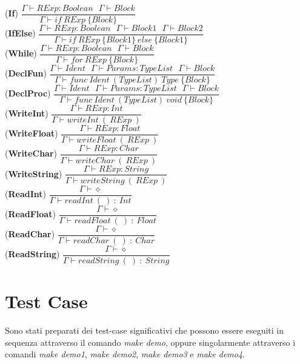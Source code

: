 \documentclass[12pt]{article}
\begin{document}
\begin{center}
\noindent(\textbf{If})
$\dfrac{\Gamma \vdash RExp:Boolean\ \ \ \Gamma \vdash Block}{\Gamma \vdash if\ RExp\ \{ Block\}}$\\[0.1in]
\noindent(\textbf{IfElse})
$\dfrac{\Gamma \vdash RExp:Boolean\ \ \ \Gamma \vdash Block1\ \ \ \Gamma \vdash Block2}{\Gamma \vdash if\ RExp\ \{ Block1\}\ else\ \{ Block1\}}$\\[0.1in]
\noindent(\textbf{While})
$\dfrac{\Gamma \vdash RExp:Boolean\ \ \ \Gamma \vdash Block}{\Gamma \vdash for\ RExp\ \{ Block\}}$\\[0.1in]

\noindent(\textbf{DeclFun})
$\dfrac{\Gamma \vdash Ident\ \ \ \Gamma \vdash Params:TypeList\ \ \ \Gamma \vdash Block}{\Gamma \vdash func\ Ident\ (TypeList)\ Type\ \{Block\}}$\\[0.1in]
\noindent(\textbf{DeclProc})
$\dfrac{\Gamma \vdash Ident\ \ \ \Gamma \vdash Params:TypeList\ \ \ \Gamma \vdash Block}{\Gamma \vdash func\ Ident\ (TypeList)\ void\ \{Block\}}$\\[0.1in]

\noindent(\textbf{WriteInt})
$\dfrac{\Gamma \vdash RExp:Int}{\Gamma \vdash writeInt\ (\ RExp\ )}$\\[0.1in]
\noindent(\textbf{WriteFloat})
$\dfrac{\Gamma \vdash RExp:Float}{\Gamma \vdash writeFloat\ (\ RExp\ )}$\\[0.1in]
\noindent(\textbf{WriteChar})
$\dfrac{\Gamma \vdash RExp:Char}{\Gamma \vdash writeChar\ (\ RExp\ )}$\\[0.1in]
\noindent(\textbf{WriteString})
$\dfrac{\Gamma \vdash RExp:String}{\Gamma \vdash writeString\ (\ RExp\ )}$\\[0.1in]
\noindent(\textbf{ReadInt})
$\dfrac{\Gamma \vdash \diamond}{\Gamma \vdash readInt\ (\ )\ :\ Int}$\\[0.1in]
\noindent(\textbf{ReadFloat})
$\dfrac{\Gamma \vdash \diamond}{\Gamma \vdash readFloat\ (\ )\ :\ Float}$\\[0.1in]
\noindent(\textbf{ReadChar})
$\dfrac{\Gamma \vdash \diamond}{\Gamma \vdash readChar\ (\ )\ :\ Char}$\\[0.1in]
\noindent(\textbf{ReadString})
$\dfrac{\Gamma \vdash \diamond}{\Gamma \vdash readString\ (\ )\ :\ String}$\\[0.1in]
\end{center}


\pagebreak
\section{Test Case}
Sono stati preparati dei test-case significativi che possono essere eseguiti in sequenza attraverso il comando \textit{make demo}, oppure singolarmente attraverso i comandi \textit{make demo1}, \textit{make demo2}, \textit{make demo3} e \textit{make demo4}.
\end{document}
